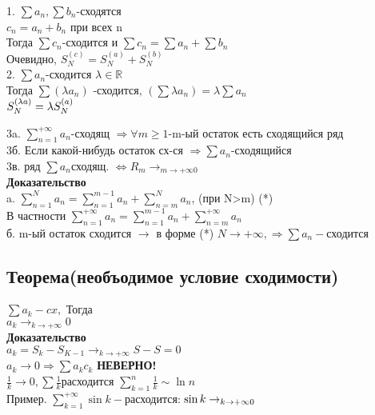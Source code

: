 \documentclass[12pt, a4paper]{article}
\begin{document}
1. $ \sum a_n, \sum b_n $-сходятся\\
	$ c_n= a_n+b_n$ при всех n\\
	Тогда $\boxed{\sum c_n \text{-сходится и }  \sum c_n =\sum a_n +\sum b_n }$\\
	Очевидно, $ S_N^{(c)}=S_N^{(a)}+S_N^{(b)} $\\
	
2. $ \sum a_n $-сходится $ \lambda \in \mathbb{R} $\\
 Тогда $\boxed{ \sum(\lambda a_n) \text{ -сходится, } (\sum\lambda a_n)=\lambda \sum a_n }$\\
$ S_N^{(\lambda a)} = \lambda S_N^{(a)} \\$

3a. $ \sum_{n=1}^{+\infty} a_n $-сходящ $ \Rightarrow \forall m \geq 1 $-m-ый остаток есть сходящийся ряд\\

3б. Если какой-нибудь остаток сх-ся $\Rightarrow \sum a_n$-сходящийся\\

3в. ряд $ \sum a_n $сходящ. $ \Leftrightarrow  R_m \rightarrow_{m \rightarrow +\infty 0}$\\
\textbf{Доказательство}\\
a. $ \sum_{n=1}^N a_n = \sum_{n=1}^{m-1} a_n +\sum_{n=m}^N a_n  $, (при N>m) (*) \\

В частности $ \boxed{\sum_{n=1}^{+\infty} a_n =  \sum_{n=1}^{m-1} a_n +\sum_{n=m}^{+\infty} a_n } $\\
б. m-ый остаток сходится  $  \rightarrow $ в  форме (*) $ N \rightarrow +\infty, \Rightarrow \sum a_n - $сходится\\


\subsection{Теорема(необъодимое условие сходимости)}
$ \sum a_k - cx, $ Тогда\\
 $\boxed{ a_k \rightarrow_{k \rightarrow + \infty} 0 }$\\
\textbf{Доказательство}\\
$ a_k = S_k - S_{K-1} \rightarrow_{k \rightarrow +\infty} S - S = 0 $\\

$ a_k \rightarrow 0 \Rightarrow \sum a_k c_k$ \textbf{НЕВЕРНО!}   \\
$ \frac{1}{k} \rightarrow 0 , \sum\frac{1}{k}   $расходится $ \boxed{\sum_{k=1}^{n} \frac{1}{k}\sim \ln n} $\\
	Пример. $ \sum_{k=1}^{+\infty} \sin k -  $расходится: $ \sin k \rightarrow_{k\rightarrow +\infty 0} \\$
\end{document}
